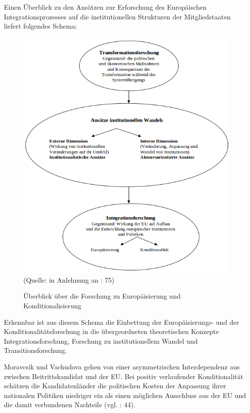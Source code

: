 Einen Überblick zu den Ansätzen zur Erforschung des Europäischen Integrationsprozesses auf die institutionellen Strukturen der Mitgliedstaaten liefert folgendes Schema:
\begin{figure}[H]
\caption{ Überblick über die Forschung zu Europäisierung und Konditionalisierung}
  \centering
  \includegraphics[width=5in]{Material/ForschungZuEuropUndKondi_ohneRand}\\
  
\scriptsize{(Quelle: in Anlehnung an \cite{huszak}: 75)}
\end{figure}
Erkennbar ist aus diesem Schema die Einbettung der Europäisierungs- und der Konditionalitätsforschung in die übergeordneten theoretischen Konzepte Integrationsforschung, Forschung zu institutionellem Wandel und Transitionsforschung.\par
Moravcsik und Vachudova gehen von einer asymmetrischen Interdependenz aus zwischen Beitrittskandidat und der EU. Bei positiv verlaufender Konditionalität schätzen die Kandidatenländer die politischen Kosten der Anpassung ihrer nationalen Politiken niedriger ein als einen möglichen Ausschluss aus der EU und die damit verbundenen Nachteile (vgl. \cite{morvac}: 44).
\par
